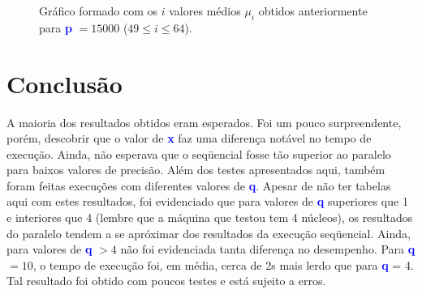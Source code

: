 \documentclass[11pt]{article}
\begin{document}
\pagebreak

\begin{center}
	\begin{figure}[!h]
		{\caption*{Gráfico formado com os $i$ valores médios $\mu_{i}$ obtidos anteriormente para \textbf{\textcolor{blue}{p}} $= 15000$ ($49 \leq i \leq 64$).}}
	\end{figure}
\end{center}

\section{Conclusão}

A maioria dos resultados obtidos eram esperados. Foi um pouco surpreendente, porém, descobrir que o valor de \textbf{\textcolor{blue}{x}} faz uma diferença notável no tempo de execução. Ainda, não esperava que o seqüencial fosse tão superior ao paralelo para baixos valores de precisão.
Além dos testes apresentados aqui, também foram feitas execuções com diferentes valores de \textbf{\textcolor{blue}{q}}. Apesar de não ter tabelas aqui com estes resultados, foi evidenciado que para valores de \textbf{\textcolor{blue}{q}} superiores que 1 e interiores que 4 (lembre que a máquina que testou tem 4 núcleos), os resultados do paralelo tendem a se apróximar dos resultados da execução seqüencial. Ainda, para valores de \textbf{\textcolor{blue}{q}} $> 4$ não foi evidenciada tanta diferença no desempenho. Para \textbf{\textcolor{blue}{q}} $= 10$, o tempo de execução foi, em média, cerca de 2s mais lerdo que para \textbf{\textcolor{blue}{q}} = 4. Tal resultado foi obtido com poucos testes e está sujeito a erros.
\end{document}
